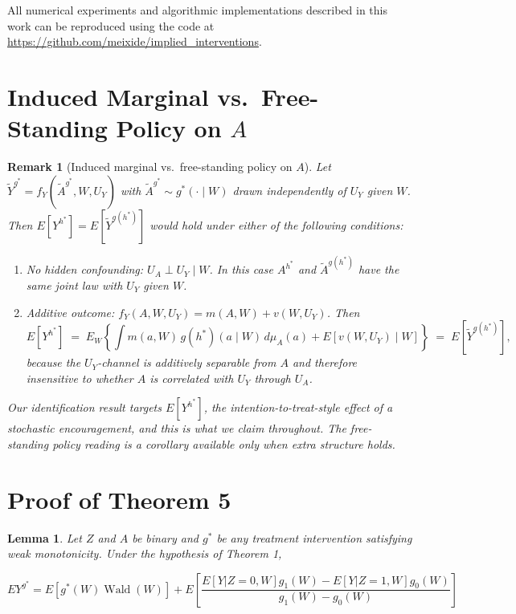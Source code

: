 \documentclass[12pt]{article}
\theoremstyle{thmstyleone}%
\newtheorem{lemma}[theo]{Lemma}%
\theoremstyle{thmstyletwo}%
\newtheorem{rem}{Remark}%
\theoremstyle{thmstylethree}%
\begin{document}
All numerical experiments and algorithmic implementations described in this work can be reproduced using the code at \url{https://github.com/meixide/implied_interventions}.


\section{Induced Marginal vs.\ Free-Standing Policy on \texorpdfstring{$A$}{A}}

\begin{rem}[Induced marginal vs.\ free-standing policy on $A$]\label{rem:indep}
Let $\widetilde Y^{g^*} = f_Y(\widetilde A^{g^*},W,U_Y)$ with $\widetilde A^{g^*}\sim g^*(\cdot\mid W)$ drawn \emph{independently} of $U_Y$ given $W$. Then $E[Y^{h^*}] = E[\widetilde Y^{g(h^*)}]$ would hold under either of the following conditions:
    \begin{enumerate}
        \item[(i)] {No hidden confounding:} $U_A \perp U_Y \mid W$. In this case $A^{h^*}$ and $\widetilde A^{g(h^*)}$ have the same joint law with $U_Y$ given $W$.
        \item[(ii)] {Additive outcome:} $f_Y(A,W,U_Y) = m(A,W) + v(W,U_Y)$. Then
        \[
        E\!\left[Y^{h^*}\right] \;=\; E_W\!\left\{\int m(a,W)\, g(h^*)(a\mid W)\, d\mu_A(a) + E[v(W,U_Y)\mid W]\right\} \;=\; E\!\left[\widetilde Y^{g(h^*)}\right],
        \]
        because the $U_Y$-channel is additively separable from $A$ and therefore insensitive to whether $A$ is correlated with $U_Y$ through $U_A$.
    \end{enumerate}
    Our identification result targets $E[Y^{h^*}]$, the intention-to-treat-style effect of a stochastic encouragement, and this is what we claim throughout. The free-standing policy reading is a corollary available only when extra structure holds.
\end{rem}


\section{Proof of Theorem 5}



\begin{lemma}\label{generald}
	Let $Z$ and $A$ be binary and $g^*$ be any treatment intervention satisfying weak monotonicity. Under the hypothesis of Theorem 1, 
	
	$$EY^{g^*} = E\left[ g^*(W) \operatorname{Wald}(W) \right]+ E \left[ \frac{E[Y| Z=0,W]g_1(W)- E[Y|Z=1,W]g_0(W)}{g_1(W)-g_0(W)}\right]$$
	
	
\end{lemma}
\end{document}
